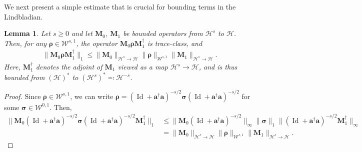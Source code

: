 \documentclass{article}
\newtheorem{lemma}{Lemma}
\newcommand{\xH}{\mathcal{H}}
\newcommand{\xW}{\mathcal{W}}
\let\bf\boldsymbol
\newcommand{\Id}{\operatorname{Id}}
\newcommand{\orho}{{\bf \rho}}
\newcommand{\oM}{{\bf M}}
\newcommand{\oa}{{\bf a}}
\newcommand{\osigma}{{\bf \sigma}}
\begin{document}
We next present a simple estimate that is crucial for bounding terms in the Lindbladian.

\begin{lemma}
\label{lem_bound}
Let $s \geq 0$ and let $\oM_0$, $\oM_1$ be bounded operators from $\xH^s$ to $\xH$. Then, for any $\orho \in \xW^{s,1}$, the operator $\oM_0 \orho \oM_1^\dag$ is trace-class, and
\begin{align}
    \|\oM_0 \orho \oM_1^\dag\|_1 \leq \|\oM_0\|_{\xH^s \to \xH} \|\orho\|_{\xW^{s,1}} \| \oM_1\|_{\xH^s \to \xH}.
\end{align}
Here, $\oM_1^\dag$ denotes the adjoint of $\oM_1$ viewed as a map $\xH^s \to \xH$, and is thus bounded from $(\xH)^*$ to $(\xH^s)^* \eqcolon \xH^{-s}$.
\end{lemma}
\begin{proof}
Since $\orho \in \xW^{s,1}$, we can write $\orho = (\Id + \oa^\dag \oa)^{-s/2} \osigma (\Id + \oa^\dag \oa)^{-s/2}$ for some $\osigma \in \xW^{0,1}$. Then,
\begin{align*}
    \|\oM_0 (\Id + \oa^\dag \oa)^{-s/2} \osigma (\Id + \oa^\dag \oa)^{-s/2} \oM_1^\dag\|_1 
    &\leq \|\oM_0 (\Id + \oa^\dag \oa)^{-s/2}\|_\infty \|\osigma\|_1 \|(\Id + \oa^\dag \oa)^{-s/2} \oM_1^\dag\|_\infty \\
    &= \|\oM_0\|_{\xH^s \to \xH} \|\orho\|_{\xW^{s,1}} \| \oM_1\|_{\xH^s \to \xH}.
\end{align*}
\end{proof}
\end{document}
